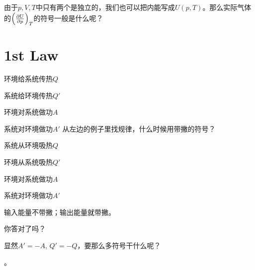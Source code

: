 \documentclass[CJK]{beamer}
\begin{document}
\begin{frame}
\bch
{}

由于$p, V, T$中只有两个是独立的，我们也可以把内能写成$U(p, T)$。那么实际气体的$\left(\frac{\partial U}{\partial p}\right)_{T}$的符号一般是什么呢？

\ech
\end{frame}


\section{1st Law}

\begin{frame}
\bch

\bitem
\item{环境给系统传热$Q$}
\item{系统给环境传热$Q'$}
\item{环境对系统做功$A$}
\item{系统对环境做功$A'$}
\eitem
\emini
{}
从左边的例子里找规律，什么时候用带撇的符号？
\emini
\ech
\end{frame}

\begin{frame}
\bch

\bitem
\item{系统从环境吸热$Q$}
\item{环境从系统吸热$Q'$}
\item{环境对系统做功$A$}
\item{系统对环境做功$A'$}
\eitem
\emini
{}

输入能量不带撇；输出能量就带撇。

\huaixiao 你答对了吗？


\emini
\ech
\end{frame}

\begin{frame}
\bch

显然$A'=-A$, $Q'=-Q$，要那么多符号干什么呢？

\skiplines

。

\ech
\end{frame}

\begin{frame}
\bch
{}
\ech
\end{frame}
\end{document}
